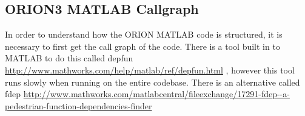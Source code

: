 
\begin{appendices}

\chapter{ORION3 MATLAB Callgraph}\label{appx:matlab-callgraph}

In order to understand how the ORION MATLAB code is structured, it
is necessary to first get the call graph of the code. There is a
tool built in to MATLAB to do this called
depfun
\url{http://www.mathworks.com/help/matlab/ref/depfun.html} %
, however this tool runs slowly when running on the entire codebase.
There is an alternative called fdep
\url{http://www.mathworks.com/matlabcentral/fileexchange/17291-fdep--a-pedestrian-function-dependencies-finder}


\resizebox{1.0\textwidth}{!}{}

\resizebox{1.0\textwidth}{!}{}

\resizebox{1.0\textwidth}{!}{}

\end{appendices}

